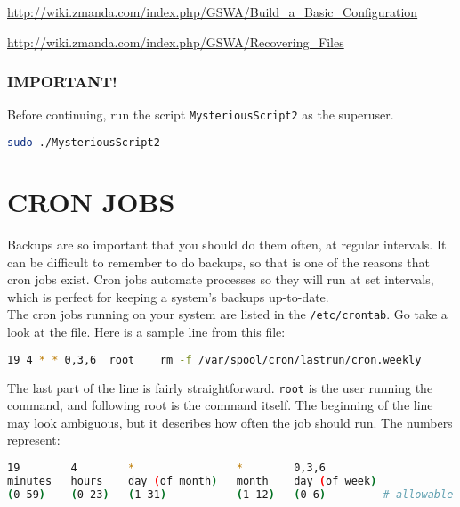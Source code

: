 \documentclass{article}
\begin{document}
\indent\indent \url{http://wiki.zmanda.com/index.php/GSWA/Build_a_Basic_Configuration}

\url{http://wiki.zmanda.com/index.php/GSWA/Recovering_Files}


\subsubsection*{IMPORTANT!}

Before continuing, run the script \verb|MysteriousScript2| as the superuser.

\begin{lstlisting}[basicstyle=\ttfamily, backgroundcolor = \color{lightgray}, language = bash, xleftmargin = 0cm, framexleftmargin = 1em]
sudo ./MysteriousScript2
\end{lstlisting}



\section*{CRON JOBS}

\indent\indent Backups are so important that you should do them often, at regular intervals. It can be difficult to remember to do backups, so that is one of the reasons that cron jobs exist. Cron jobs automate processes so they will run at set intervals, which is perfect for keeping a system's backups up-to-date. \\

The cron jobs running on your system are listed in the \verb|/etc/crontab|. Go take a look at the file. Here is a sample line from this file:

\begin{lstlisting}[basicstyle=\ttfamily, backgroundcolor = \color{lightgray}, language = bash, xleftmargin = 0cm, framexleftmargin = 1em]
19 4 * * 0,3,6  root	rm -f /var/spool/cron/lastrun/cron.weekly
\end{lstlisting}

The last part of the line is fairly straightforward. \verb|root| is the user running the command, and following root is the command itself. The beginning of the line may look ambiguous, but it describes how often the job should run. The numbers represent:

\begin{lstlisting}[basicstyle=\ttfamily, backgroundcolor = \color{lightgray}, language = bash, xleftmargin = 0cm, framexleftmargin = 1em]
19        4        *                *        0,3,6
minutes   hours    day (of month)   month    day (of week)
(0-59)    (0-23)   (1-31)           (1-12)   (0-6)         # allowable values
\end{lstlisting}
\end{document}
